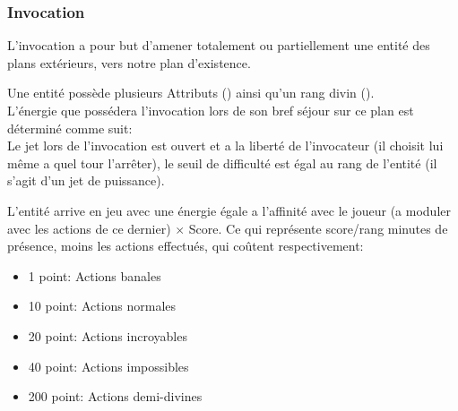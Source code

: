 \subsubsection{Invocation}
L'invocation a pour but d'amener totalement ou partiellement une entité des plans extérieurs, vers notre plan d'existence.

Une entité possède plusieurs Attributs () ainsi qu'un rang divin ().\\
L'énergie que possédera l'invocation lors de son bref séjour sur ce plan est déterminé comme suit:\\
Le jet lors de l'invocation est ouvert et a la liberté de l'invocateur 
(il choisit lui même a quel tour l'arrêter), le seuil de difficulté est égal au rang de l'entité (il s’agit d’un jet de puissance).

L'entité arrive en jeu avec une énergie égale a l'affinité avec le joueur (a moduler avec les actions de ce dernier) $\times$ Score.
Ce qui représente score/rang minutes de présence, moins les actions effectués, qui coûtent respectivement:
\begin{itemize}
    \item 1 point: Actions banales
    \item 10 point: Actions normales
    \item 20 point: Actions incroyables
    \item 40 point: Actions impossibles
    \item 200 point: Actions demi-divines
\end{itemize}
